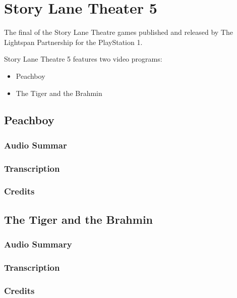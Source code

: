 \chapter{Story Lane Theater 5}


The final of the Story Lane Theatre games published and released by The Lightspan Partnership for the PlayStation 1.

Story Lane Theatre 5 features two video programs:

\begin{itemize}
    \item Peachboy
    \item The Tiger and the Brahmin
\end{itemize}

\clearpage
\newpage

\section{Peachboy}

\subsection{Audio Summar}

\subsection{Transcription}

\subsection{Credits}

\section{The Tiger and the Brahmin}

\subsection{Audio Summary}

\subsection{Transcription}

\subsection{Credits}